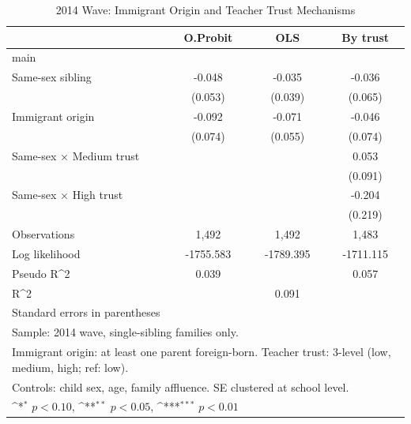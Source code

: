 \documentclass[12pt]{article}
\begin{document}
\begin{table}[htbp]\centering
\def\sym#1{\ifmmode^{#1}\else\(^{#1}\)\fi}
\caption{2014 Wave: Immigrant Origin and Teacher Trust Mechanisms\label{tab:wave2014}}
\begin{tabular}{l*{3}{c}}
\toprule
                &\multicolumn{1}{c}{O.Probit}&\multicolumn{1}{c}{OLS}&\multicolumn{1}{c}{By trust}\\
\midrule
main            &                  &                  &                  \\
Same-sex sibling&   -0.048         &   -0.035         &   -0.036         \\
                &  (0.053)         &  (0.039)         &  (0.065)         \\
Immigrant origin&   -0.092         &   -0.071         &   -0.046         \\
                &  (0.074)         &  (0.055)         &  (0.074)         \\
Same-sex × Medium trust&                  &                  &    0.053         \\
                &                  &                  &  (0.091)         \\
Same-sex × High trust&                  &                  &   -0.204         \\
                &                  &                  &  (0.219)         \\
\midrule
Observations    &    1,492         &    1,492         &    1,483         \\
Log likelihood  &-1755.583         &-1789.395         &-1711.115         \\
Pseudo R^2      &    0.039         &                  &    0.057         \\
R^2             &                  &    0.091         &                  \\
\bottomrule
\multicolumn{4}{l}{\footnotesize Standard errors in parentheses}\\
\multicolumn{4}{l}{\footnotesize Sample: 2014 wave, single-sibling families only.}\\
\multicolumn{4}{l}{\footnotesize Immigrant origin: at least one parent foreign-born. Teacher trust: 3-level (low, medium, high; ref: low).}\\
\multicolumn{4}{l}{\footnotesize Controls: child sex, age, family affluence. SE clustered at school level.}\\
\multicolumn{4}{l}{\footnotesize \sym{*} \(p<0.10\), \sym{**} \(p<0.05\), \sym{***} \(p<0.01\)}\\
\end{tabular}
\end{table}
\end{document}
